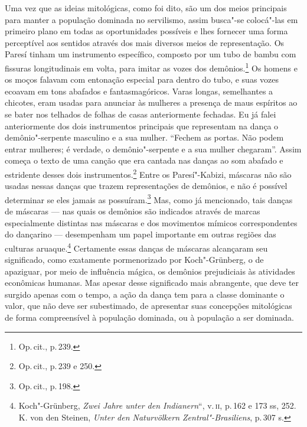 Uma vez que as ideias mitológicas, como foi dito, são um dos meios
principais para manter a população dominada no servilismo, assim
busca"-se colocá"-las em primeiro plano em todas as oportunidades
possíveis e lhes fornecer uma forma perceptível aos sentidos através dos
mais diversos meios de representação. Os Paresí tinham um instrumento
específico, composto por um tubo de bambu com fissuras longitudinais em
volta, para imitar as vozes dos demônios.\footnote{Op.\,cit., p.\,239.} Os
homens e os moços falavam com entonação especial para dentro do tubo, e
suas vozes ecoavam em tons abafados e fantasmagóricos. Varas longas,
semelhantes a chicotes, eram usadas para anunciar às mulheres a presença
de maus espíritos ao se bater nos telhados de folhas de casas
anteriormente fechadas. Eu já falei anteriormente dos dois instrumentos
principais que representam na dança o demônio"-serpente masculino e a sua
mulher. ``Fechem as portas. Não podem entrar mulheres; é verdade, o
demônio"-serpente e a sua mulher chegaram''. Assim começa o texto de uma
canção que era cantada nas danças ao som abafado e estridente desses
dois instrumentos.\footnote{Op.\,cit., p.\,239 e 250.} Entre os
Paresí"-Kabizi, máscaras não são usadas nessas danças que trazem
representações de demônios, e não é possível determinar se eles jamais
as possuíram.\footnote{Op.\,cit., p.\,198.} Mas, como já mencionado, tais
danças de máscaras --- nas quais os demônios são indicados através de
marcas especialmente distintas nas máscaras e dos movimentos mímicos
correspondentes do dançarino --- desempenham um papel importante em
outras regiões das culturas aruaque.\footnote{Koch"-Grünberg, \textit{Zwei
  Jahre unter den Indianern}``, v.\,\textsc{ii}, p.\,162 e 173 ss, 252. K. von den
  Steinen, \textit{Unter den Naturvölkern Zentral"-Brasiliens}, p.\,307 s.}
Certamente essas danças de máscaras alcançaram seu significado, como
exatamente pormenorizado por Koch"-Grünberg, o de apaziguar, por meio de
influência mágica, os demônios prejudiciais às atividades econômicas
humanas. Mas apesar desse significado mais abrangente, que deve ter
surgido apenas com o tempo, a ação da dança tem para a classe dominante
o valor, que não deve ser subestimado, de apresentar suas concepções
mitológicas de forma compreensível à população dominada, ou à
população a ser dominada.

